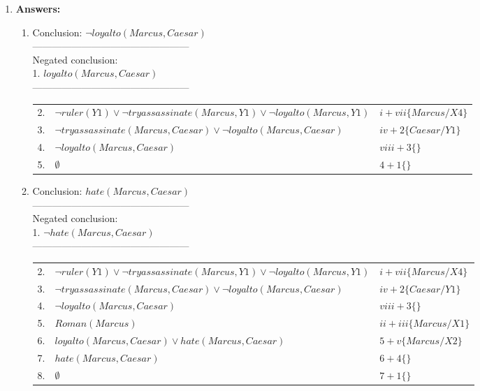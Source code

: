 \documentclass{article}%
\begin{document}
\begin{enumerate}
\begin{enumerate}
		\item \textbf{Answers:}
		\begin{enumerate}
		\item Conclusion: $  \neg loyalto(Marcus, Caesar)$\\
		------------------------------------------------\\
		Negated conclusion:  \\
		1. $ loyalto(Marcus, Caesar) $ \\
		------------------------------------------------\\
		\begin{tabular}{c|p{8cm}|l}
		2. &$ \neg ruler(Y1) \vee \neg tryassassinate(Marcus,Y1)  \vee \neg loyalto(Marcus,Y1) $ & $i + vii \lbrace Marcus/X4 \rbrace $\\ 
		3. & $ \neg tryassassinate(Marcus,Caesar)  \vee \neg loyalto(Marcus,Caesar)  $ &  $iv + 2 \lbrace Caesar / Y1 \rbrace$ \\
		4. &$ \neg loyalto(Marcus,Caesar) $& $viii + 3 \lbrace \rbrace$\\
		5. & $ \emptyset $ &$ 4 + 1 \lbrace \rbrace$\\

		\end{tabular} 
		
		\item Conclusion: $  hate(Marcus, Caesar)$\\
		------------------------------------------------\\
		Negated conclusion:  \\
		1. $ \neg hate(Marcus, Caesar) $ \\
		------------------------------------------------\\
		\begin{tabular}{c|p{8cm}|l}
		2. &$ \neg ruler(Y1) \vee \neg tryassassinate(Marcus,Y1)  \vee \neg loyalto(Marcus,Y1) $ & $i + vii \lbrace Marcus/X4 \rbrace $\\ 
		3. & $ \neg tryassassinate(Marcus,Caesar)  \vee \neg loyalto(Marcus,Caesar)  $ &  $iv + 2 \lbrace Caesar / Y1 \rbrace$ \\
		4. &$ \neg loyalto(Marcus,Caesar) $& $viii + 3 \lbrace \rbrace$\\
		5. & $ Roman(Marcus) $ &$ ii + iii \lbrace Marcus / X1 \rbrace$\\
		6. & $ loyalto(Marcus, Caesar) \vee hate(Marcus, Caesar)  $ &$ 5 + v \lbrace Marcus / X2 \rbrace$\\
		7. & $ hate(Marcus, Caesar)  $ &$ 6 + 4 \lbrace \rbrace$\\
		8. & $ \emptyset  $ &$ 7 + 1 \lbrace \rbrace$\\
		\end{tabular} 
		\end{enumerate} 
	\end{enumerate}
	



\end{enumerate}
\end{document}
